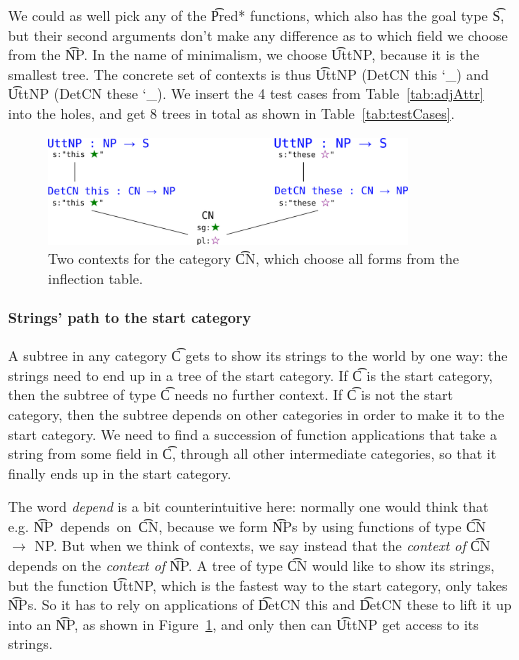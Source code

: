 We could as well pick any of the \t{Pred*} functions, which also has the goal
type \t{S}, but their second arguments don't make any difference as to
which field we choose from the \t{NP}. In the name of minimalism, we
choose \t{UttNP}, because it is the smallest tree. The concrete set of
contexts is thus \t{UttNP (DetCN this \char`_)} and \t{UttNP (DetCN
  these \char`_)}.  We insert the 4 test cases from
Table~\ref{tab:adjAttr} into the holes, and get 8 trees in total as
shown in Table~\ref{tab:testCases}.

\begin{figure}[t]
\centering
\includegraphics[width=0.85\textwidth]{img/context-example.png}
\caption{Two contexts for the category \t{CN}, which choose all forms from the inflection table.}
\label{fig:context-general}
\end{figure}



\paragraph{Strings' path to the start category} 
A subtree in any category \t{C} gets to show its strings to the world
by one way: the strings need to end up in a tree of the start
category.  If \t{C} is the start category, then the subtree of type
\t{C} needs no further context. If \t{C} is not the start category,
then the subtree depends on other categories in order to make it to
the start category. We need to find a succession of function
applications that take a string from some field in \t{C}, through all
other intermediate categories, so that it finally ends up in the start
category.

The word \emph{depend} is a bit counterintuitive here: normally one
would think that e.g. \t{NP}~depends~on~\t{CN}, because we form
\t{NP}s by using functions of type \t{CN $\rightarrow$ NP}. But when
we think of contexts, we say instead that the \emph{context of} \t{CN}
depends on the \emph{context of} \t{NP}. A tree of type \t{CN} would
like to show its strings, but the function \t{UttNP}, which is the
fastest way to the start category, only takes \t{NP}s. So it has to
rely on applications of \t{DetCN this} and \t{DetCN these} to lift it
up into an \t{NP}, as shown in Figure~\ref{fig:context-general}, and
only then can \t{UttNP} get access to its strings.

